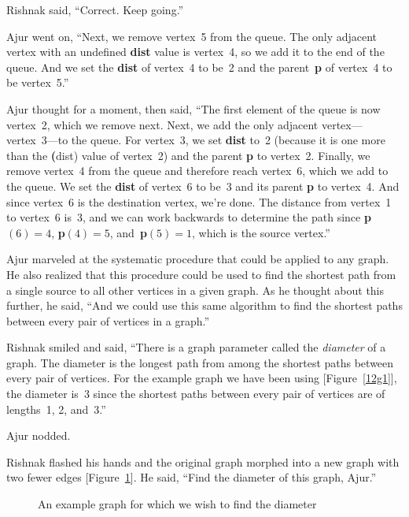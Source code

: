 Rishnak said, ``Correct. Keep going.''

Ajur went on, ``Next, we remove vertex~5 from the queue. The only adjacent vertex with an undefined \textbf{dist} value is vertex~4, so we add it to the end of the queue. And we set the \textbf{dist} of vertex~4 to be~2 and the parent~\textbf{p} of vertex~4 to be vertex~5.''

Ajur thought for a moment, then said, ``The first element of the queue is now vertex~2, which we remove next. Next, we add the only adjacent vertex---vertex~3---to the queue. For vertex~3, we set \textbf{dist} to~2 (because it is one more than the \textbf(dist) value of vertex~2) and the parent \textbf{p} to vertex~2. Finally, we remove vertex~4 from the queue and therefore reach vertex~6, which we add to the queue. We set the \textbf{dist} of vertex~6 to be~3 and its parent \textbf{p} to vertex~4. And since vertex~6 is the destination vertex, we're done. The distance from vertex~1 to vertex~6 is~3, and we can work backwards to determine the path since \textbf{p}$(6)=4$, \textbf{p}$(4)=5$, and~\textbf{p}$(5)=1$, which is the source vertex.''

Ajur marveled at the systematic procedure that could be applied to any graph. He also realized that this procedure could be used to find the shortest path from a single source to all other vertices in a given graph. As he thought about this further, he said, ``And we could use this same algorithm to find the shortest paths between every pair of vertices in a graph.''

Rishnak smiled and said, ``There is a graph parameter called the \textit{diameter} of a graph. The diameter is the longest path from among the shortest paths between every pair of vertices. For the example graph we have been using [Figure~\ref{12g1}], the diameter is~3 since the shortest paths between every pair of vertices are of lengths~1, 2, and~3.'' 

Ajur nodded.

Rishnak flashed his hands and the original graph morphed into a new graph with two fewer edges [Figure~\ref{12g3}].  He said, ``Find the diameter of this graph, Ajur.''

\begin{figure}
\begin{center}
\caption{An example graph for which we wish to find the diameter}\label{12g3}
\end{center}
\end{figure}

